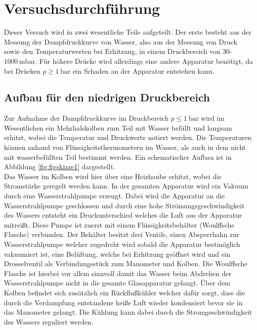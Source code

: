 \section{Versuchsdurchführung}

Dieser Versuch wird in zwei wesentliche Teile aufgeteilt. Der erste besteht aus der Messung der Dampfdruckkurve von Wasser, also aus der Messung von Druck sowie den Temperaturwerten bei Erhitzung, in einem 
Druckbereich von $30$-$\SI{1000}{\milli\bar}$. Für höhere Drücke wird allerdings eine andere Apparatur benötigt, da bei Drücken $p \geq \SI{1}{\bar}$ ein Schaden an der Apparatur entstehen kann.

\subsection{Aufbau für den niedrigen Druckbereich} %
Zur Aufnahme der Dampfdruckkurve im Druckbereich $p \leq \SI{1}{\bar}$ wird im Wesentlichen ein Mehrhalskolben zum Teil mit Wasser befüllt und langsam erhitzt, wobei die Temperatur und Druckwerte notiert werden. 
Die Temperaturen können anhand von Flüssigkeitsthermometern im Wasser, als auch in dem nicht mit wasserbefüllten Teil bestimmt werden.
Ein schematischer Aufbau ist in Abbildung \ref{fig:figskizze1} dargestellt. 
\newline
\\
Das Wasser im Kolben wird hier über eine Heizhaube erhitzt, wobei die Stromstärke geregelt werden kann. 
In der gesamten Apparatur wird ein Vakuum durch eine Wasserstrahlpumpe erzeugt. Dabei wird die Apparatur an die Wasserstrahlpumpe geschlossen und durch eine hohe Strömungsgeschwindigkeit
des Wassers entsteht ein Druckunterschied welches die Luft aus der Apparatur mitreißt. Diese Pumpe ist zuerst mit einem Flüssigkeitsbehälter (Woulffsche Flasche) verbunden. Der Behälter besitzt drei Ventile, einen Absperrhahn zur Wasserstrahlpumpe welcher 
zugedreht wird sobald die Apparatur bestmöglich vakuumiert ist, eine Belüftung, welche bei Erhitzung geöffnet wird und ein Drosselventil als Verbindungsstück zum Manometer und Kolben. 
Die Woulffsche Flasche ist hierbei vor allem sinnvoll damit das Wasser beim Abdrehen der Wasserstrahlpumpe nicht in die gesamte Glasapparatur gelangt.
Über dem Kolben befindet sich zusätzlich ein Rückflußkühler welcher dafür sorgt, dass die durch die Verdampfung entstandene heiße Luft wieder kondensiert bevor sie in das Manometer gelangt. Die Kühlung kann dabei durch die Stromgeschwindigkeit
des Wassers reguliert werden.

